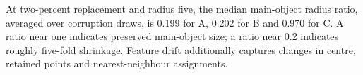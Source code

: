 At two-percent replacement and radius five, the median main-object radius ratio, averaged over corruption draws, is 0.199 for A, 0.202 for B and 0.970 for C. A ratio near one indicates preserved main-object size; a ratio near 0.2 indicates roughly five-fold shrinkage. Feature drift additionally captures changes in centre, retained points and nearest-neighbour assignments.
